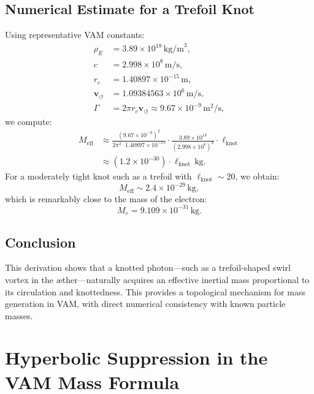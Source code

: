 \documentclass[12pt]{article}
\begin{document}
  \subsection{Numerical Estimate for a Trefoil Knot}

  Using representative VAM constants:
  \begin{align*}
    \rho_{\scriptscriptstyle\boldsymbol\!E}&= 3.89 \times 10^{18}\,\mathrm{kg/m}^3, \\
    c &= 2.998 \times 10^8\,\mathrm{m/s}, \\
    r_c &= 1.40897 \times 10^{-15}\,\mathrm{m}, \\
    \mathbf{v}_{\scriptscriptstyle\boldsymbol{\circlearrowleft}} &= 1.09384563 \times 10^6\,\mathrm{m/s}, \\
    \Gamma &= 2\pi r_c \mathbf{v}_{\scriptscriptstyle\boldsymbol{\circlearrowleft}} \approx 9.67 \times 10^{-9}\,\mathrm{m}^2/\mathrm{s},
  \end{align*}
  we compute:
  \begin{align*}
    M_\text{eff} &\approx \frac{(9.67 \times 10^{-9})^2}{2\pi^2 \cdot 1.40897 \times 10^{-15}} \cdot \frac{3.89 \times 10^{18}}{(2.998 \times 10^8)^2} \cdot \ell_\text{knot} \\
    &\approx (1.2 \times 10^{-30}) \cdot \ell_\text{knot}\,\mathrm{kg}.
  \end{align*}
  For a moderately tight knot such as a trefoil with $\ell_\text{knot} \sim 20$, we obtain:
  \begin{equation}
    M_\text{eff} \sim 2.4 \times 10^{-29}\,\mathrm{kg},
  \end{equation}
  which is remarkably close to the mass of the electron:
  \begin{equation}
    M_e = 9.109 \times 10^{-31}\,\mathrm{kg}.
  \end{equation}

  \subsection*{Conclusion}

  This derivation shows that a knotted photon---such as a trefoil-shaped swirl vortex in the \ae{}ther---naturally acquires an effective inertial mass proportional to its circulation and knottedness. This provides a topological mechanism for mass generation in VAM, with direct numerical consistency with known particle masses.
\section{Hyperbolic Suppression in the VAM Mass Formula}
\end{document}
